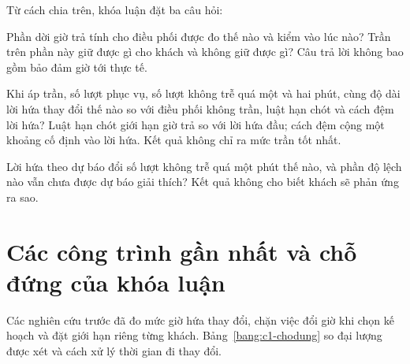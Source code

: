 Từ cách chia trên, khóa luận đặt ba câu hỏi:
\begin{description}[leftmargin=1.15cm,style=nextline,itemsep=3pt]
\item[CH1.] Phần dời giờ trả tính cho điều phối được đo thế nào và kiểm vào lúc nào? Trần trên phần này giữ
được gì cho khách và không giữ được gì? Câu trả lời không bao gồm bảo đảm giờ tới thực tế.
\item[CH2.] Khi áp trần, số lượt phục vụ, số lượt không trễ quá một và hai phút, cùng độ dài lời hứa thay đổi
thế nào so với điều phối không trần, luật hạn chót và cách đệm lời hứa? Luật hạn chót giới hạn giờ trả so với
lời hứa đầu; cách đệm cộng một khoảng cố định vào lời hứa. Kết quả không chỉ ra mức trần tốt nhất.
\item[CH3.] Lời hứa theo dự báo đổi số lượt không trễ quá một phút thế nào, và phần độ lệch nào vẫn chưa được
dự báo giải thích? Kết quả không cho biết khách sẽ phản ứng ra sao.
\end{description}

\section{Các công trình gần nhất và chỗ đứng của khóa luận}
\label{muc:c1-lienquan}

Các nghiên cứu trước đã đo mức giờ hứa thay đổi, chặn việc đổi giờ khi chọn kế hoạch và đặt giới hạn riêng
từng khách. Bảng~\ref{bang:c1-chodung} so đại lượng được xét và cách xử lý thời gian đi thay đổi.

